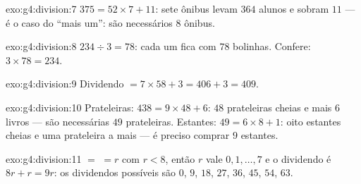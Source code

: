 \begin{solution}{exo:g4:division:7}
$375 = 52 \times 7 + 11$: sete ônibus levam $364$ alunos e sobram
$11$ --- é o caso do ``mais um'': são necessários $8$ ônibus.
\end{solution}

\begin{solution}{exo:g4:division:8}
$234 \div 3 = 78$: cada um fica com $78$ bolinhas. Confere:
$3 \times 78 = 234$.
\end{solution}

\begin{solution}{exo:g4:division:9}
Dividendo $= 7 \times 58 + 3 = 406 + 3 = 409$.
\end{solution}

\begin{solution}{exo:g4:division:10}
Prateleiras: $438 = 9 \times 48 + 6$: $48$ prateleiras cheias e mais
$6$ livros --- são necessárias $49$ prateleiras. Estantes:
$49 = 6 \times 8 + 1$: oito estantes cheias e uma prateleira a mais
--- é preciso comprar $9$ estantes.
\end{solution}

\begin{solution}{exo:g4:division:11}
 $=$  $= r$ com $r < 8$, então $r$ vale $0, 1, \dots,
7$ e o dividendo é $8r + r = 9r$: os dividendos possíveis são $0$,
$9$, $18$, $27$, $36$, $45$, $54$, $63$.
\end{solution}
